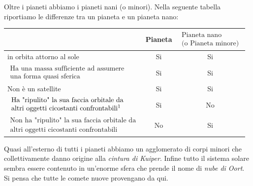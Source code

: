 \vspace{0.2cm}Oltre i pianeti abbiamo i pianeti nani (o minori). Nella seguente tabella riportiamo le differenze tra un pianeta e un pianeta nano:

\begin{center}
    \begin{tabular}{|l|c|c|}
        \hline
        & Pianeta & $\begin{array}{c}
            \text{Pianeta nano}\\
            \text{(o Pianeta minore)}
        \end{array}$\\
        \hline
        \hspace{0.17cm}\E in orbita attorno al sole & Si & Si\\
        \hline
        $\begin{array}{l}
            \text{Ha una massa sufficiente ad assumere}\\
            \text{una forma quasi sferica}
        \end{array}$ & Si & Si\\
        \hline
        \hspace{0.17cm}Non è un satellite & Si & Si\\
        \hline
        $\begin{array}{l}
            \text{Ha "ripulito" la sua faccia orbitale da}\\
            \text{altri oggetti cicostanti confrontabili\footnotemark}
        \end{array}$ & Si & No\\
        \hline
        $\begin{array}{l}
            \text{Non ha "ripulito" la sua faccia orbitale da}\\
            \text{altri oggetti cicostanti confrontabili}
        \end{array}$ & No & Si\\
        \hline
    \end{tabular}
\end{center}



Quasi all'esterno di tutti i pianeti abbiamo un agglomerato di corpi minori che collettivamente danno origine alla \textit{cintura di Kuiper}. Infine tutto il sistema solare sembra essere contenuto in un'enorme sfera che prende il nome di \textit{nube di Oort}. Si pensa che tutte le comete nuove provengano da qui.

